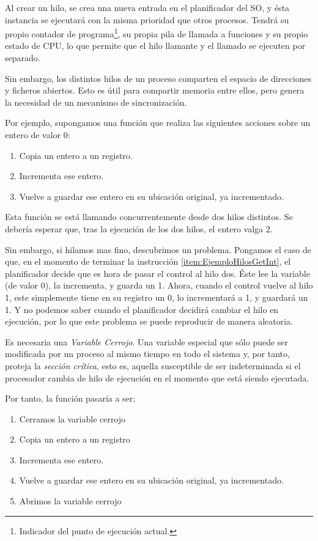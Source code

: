 Al crear un hilo, se crea una nueva entrada en el planificador del \gls{SO}, y ésta instancia se 
ejecutará con la misma prioridad que otros procesos. Tendrá su propio contador de programa\footnote{Indicador del punto 
de ejecución actual.}, su propia pila de llamada a funciones y su propio estado de CPU, lo que permite que el hilo 
llamante y el llamado se ejecuten por separado.

Sin embargo, los distintos hilos de un proceso comparten el espacio de direcciones y ficheros abiertos. Esto es útil 
para compartir memoria entre ellos, pero genera la necesidad de un mecanismo de sincronización.

Por ejemplo, supongamos una función que realiza las siguientes acciones sobre un entero de valor 0:
\begin{enumerate}
 \item Copia un entero a un registro\label{item:EjemploHilosGetInt}.
 \item Incrementa ese entero.
 \item Vuelve a guardar ese entero en su ubicación original, ya incrementado.
\end{enumerate}

Esta función se está llamando concurrentemente desde dos hilos distintos. Se debería esperar que, 
tras la ejecución de los dos hilos, el entero valga 2.

Sin embargo, si hilamos mas fino, descubrimos un problema. Pongamos el caso de que, en el momento de terminar la 
instrucción \ref{item:EjemploHilosGetInt}, el planificador decide que es hora de pasar el control al hilo dos. 
Éste lee la variable (de valor 0), la incrementa, y guarda un 1. Ahora, cuando el control vuelve al hilo 1, este 
simplemente tiene en su registro un 0, lo incrementará a 1, y guardará un 1. Y no podemos saber cuando el planificador 
decidirá cambiar el hilo en ejecución, por lo que este problema se puede reproducir de manera aleatoria.

Es necesaria una \emph{Variable Cerrojo}. Una variable especial que sólo puede ser 
modificada por un proceso al mismo tiempo en todo el sistema y, por tanto, proteja la \emph{sección 
crítica}, esto es, aquella susceptible de ser indeterminada si el procesador cambia de hilo de 
ejecución en el momento que está siendo ejecutada.

Por tanto, la función pasaría a ser:
\begin{enumerate}
 \item Cerramos la variable cerrojo
 \item Copia un entero a un registro
 \item Incrementa ese entero.
 \item Vuelve a guardar ese entero en su ubicación original, ya incrementado.
 \item Abrimos la variable cerrojo
\end{enumerate}

